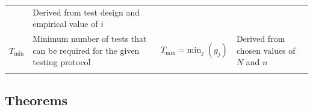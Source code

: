 \documentclass[letterpaper]{article}
\begin{document}
\begin{footnotesize}
\begin{longtable}[]{@{}llll@{}}
\begin{minipage}[t]{0.28\columnwidth}
\end{minipage} & \begin{minipage}[t]{0.24\columnwidth}\raggedright
	Derived from test design and empirical value of $i$\strut
\end{minipage}\tabularnewline
\begin{minipage}[t]{0.08\columnwidth}\raggedright
	$T_{\text{min}}$\strut
\end{minipage} & \begin{minipage}[t]{0.28\columnwidth}\raggedright
	Minimum number of tests that can be required for the given testing
	protocol\strut
\end{minipage} & \begin{minipage}[t]{0.28\columnwidth}\raggedright
	$T_{\text{min}}=\text{min}_j \;(g_j)$\strut
\end{minipage} & \begin{minipage}[t]{0.24\columnwidth}\raggedright
	Derived from chosen values of $N$ and $n$\strut
\end{minipage}\tabularnewline
\begin{minipage}[t]{0.08\columnwidth}\raggedright
	\strut
\end{minipage} & \begin{minipage}[t]{0.28\columnwidth}\raggedright
	\strut
\end{minipage} & \begin{minipage}[t]{0.28\columnwidth}\raggedright
	\strut
\end{minipage} & \begin{minipage}[t]{0.24\columnwidth}\raggedright
	\strut
\end{minipage}\tabularnewline
\bottomrule
\end{longtable}


\end{footnotesize}


\hypertarget{theorems}{%
\subsection{Theorems}\label{theorems}}
\end{document}
